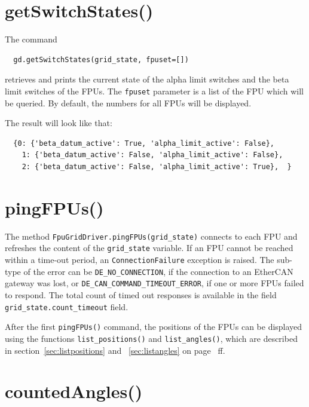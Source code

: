 \documentclass[fontsize=12,a4paper]{scrreprt}
\begin{document}
\section{getSwitchStates()}

The command
\begin{verbatim}
  gd.getSwitchStates(grid_state, fpuset=[])
\end{verbatim}
retrieves and prints the current state of the alpha limit switches
and the beta limit switches of the FPUs.  The \texttt{fpuset}
parameter is a list of the FPU which will be queried. By default, the
numbers for all FPUs will be displayed.

The result will look like that:
\begin{verbatim}
  {0: {'beta_datum_active': True, 'alpha_limit_active': False},
    1: {'beta_datum_active': False, 'alpha_limit_active': False},
    2: {'beta_datum_active': False, 'alpha_limit_active': True},  }
\end{verbatim}




\section{pingFPUs()}
\begin{sloppypar}
  The method
\texttt{FpuGridDriver.pingFPUs(grid\_state)} connects to each FPU and
refreshes the content of the \texttt{grid\_state} variable. If an FPU
cannot be reached within a time-out period, an
\texttt{ConnectionFailure} exception is raised. The sub-type of the
error can be \texttt{DE\_NO\_CONNECTION}, if the connection to an
EtherCAN gateway was lost, or
\texttt{DE\_CAN\_COMMAND\_TIMEOUT\_ERROR}, if one or more FPUs failed
to respond. The total count of timed out responses is available in the
field \texttt{grid\_state.count\_timeout} field.
\end{sloppypar}

After the first \texttt{pingFPUs()} command, the positions of the FPUs
can be displayed using the functions \texttt{list\_positions()} and
\texttt{list\_angles()}, which are described in
section~\ref{sec:listpositions} and ~\ref{sec:listangles} on
page~\pageref{sec:listpositions} ff.


\section{countedAngles()}
\label{sec:countedangles}
\end{document}
